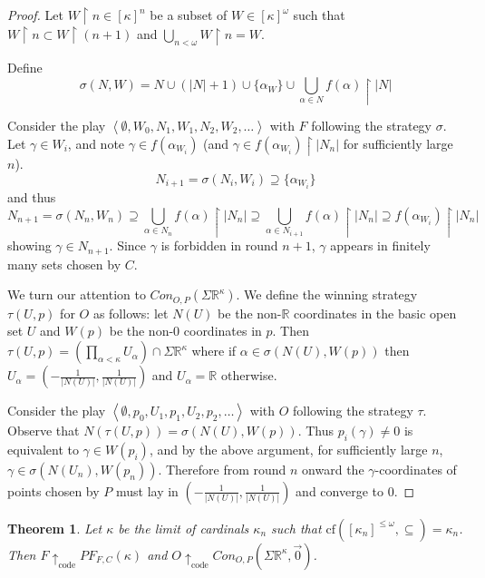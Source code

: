 \documentclass[11pt]{article}
\theoremstyle{plain}
\newtheorem{theorem}{Theorem}
\theoremstyle{definition}
\theoremstyle{remark}
\newcommand{\codewin}{\uparrow_{\text{code}}}
\newcommand{\congame}[2]{Con_{O,P}(#1,#2)}
\newcommand{\sigmaprodr}[1]{\Sigma\mathbb{R}^{#1}}
\begin{document}
\begin{proof}
Let $W\restriction n \in [\kappa]^n$ be a subset of $W\in[\kappa]^\omega$ such that $W\restriction n \subset W \restriction (n+1)$ and $\bigcup_{n<\omega} W\restriction n = W$.

Define \[\sigma(N,W) = N \cup (|N|+1) \cup \{\alpha_W\} \cup \bigcup_{\alpha \in N} f(\alpha) \restriction |N|\]

Consider the play $\left<\emptyset,W_0,N_1,W_1,N_2,W_2,\dots\right>$ with $F$ following the strategy $\sigma$. Let $\gamma \in W_i$, and note $\gamma \in f(\alpha_{W_i})$ (and $\gamma \in f(\alpha_{W_i})\restriction |N_n|$ for sufficiently large $n$). \[N_{i+1} = \sigma(N_i,W_i) \supseteq \{\alpha_{W_i}\}\] and thus \[N_{n+1} = \sigma(N_n,W_n) \supseteq \bigcup_{\alpha \in N_n} f(\alpha) \restriction |N_n| \supseteq \bigcup_{\alpha \in N_{i+1}} f(\alpha) \restriction |N_n| \supseteq f(\alpha_{W_i}) \restriction |N_n|\] showing $\gamma \in N_{n+1}$. Since $\gamma$ is forbidden in round $n+1$, $\gamma$ appears in finitely many sets chosen by $C$.

We turn our attention to $Con_{O,P}(\Sigma\mathbb{R}^\kappa)$. We define the winning strategy $\tau(U,p)$ for $O$ as follows: let $N(U)$ be the non-$\mathbb{R}$ coordinates in the basic open set $U$ and $W(p)$ be the non-$0$ coordinates in $p$. Then $\tau(U,p) = \left(\prod_{\alpha<\kappa} U_\alpha\right) \cap \Sigma\mathbb{R}^\kappa$ where if $\alpha \in \sigma(N(U),W(p))$ then $U_\alpha = (-\frac{1}{|N(U)|},\frac{1}{|N(U)|})$ and $U_\alpha=\mathbb{R}$ otherwise.

Consider the play $\left<\emptyset,p_0,U_1,p_1,U_2,p_2,\dots\right>$ with $O$ following the strategy $\tau$. Observe that $N(\tau(U,p))=\sigma(N(U),W(p))$. Thus $p_i(\gamma)\not=0$ is equivalent to $\gamma \in W(p_i)$, and by the above argument, for sufficiently large $n$, $\gamma \in \sigma(N(U_n),W(p_n))$. Therefore from round $n$ onward the $\gamma$-coordinates of points chosen by $P$ must lay in $(-\frac{1}{|N(U)|},\frac{1}{|N(U)|})$ and converge to $0$.
\end{proof}

\begin{theorem}
Let $\kappa$ be the limit of cardinals $\kappa_n$ such that $\textrm{cf}([\kappa_n]^{\leq\omega},\subseteq)=\kappa_n$. Then $F \codewin PF_{F,C}(\kappa)$ and $O \codewin \congame{\sigmaprodr{\kappa}}{\vec{0}}$.
\end{theorem}
\end{document}
